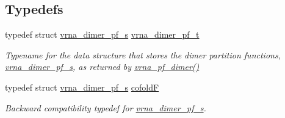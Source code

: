 \subsection*{Typedefs}
\begin{DoxyCompactItemize}
\item 
typedef struct \mbox{\hyperlink{group__pf__cofold_structvrna__dimer__pf__s}{vrna\+\_\+dimer\+\_\+pf\+\_\+s}} \mbox{\hyperlink{group__pf__cofold_ga444df1587c9a2ca15b8eb25188f629c3}{vrna\+\_\+dimer\+\_\+pf\+\_\+t}}
\begin{DoxyCompactList}\small\item\em Typename for the data structure that stores the dimer partition functions, \mbox{\hyperlink{group__pf__cofold_structvrna__dimer__pf__s}{vrna\+\_\+dimer\+\_\+pf\+\_\+s}}, as returned by \mbox{\hyperlink{group__pf__cofold_ga4e5c7d06c302a7c59fc0d64dc142ca63}{vrna\+\_\+pf\+\_\+dimer()}} \end{DoxyCompactList}\item 
typedef struct \mbox{\hyperlink{group__pf__cofold_structvrna__dimer__pf__s}{vrna\+\_\+dimer\+\_\+pf\+\_\+s}} \mbox{\hyperlink{group__pf__cofold_ga5445d8d96a40e9e79b1fa5a7f1a6b7ea}{cofoldF}}
\begin{DoxyCompactList}\small\item\em Backward compatibility typedef for \mbox{\hyperlink{group__pf__cofold_structvrna__dimer__pf__s}{vrna\+\_\+dimer\+\_\+pf\+\_\+s}}. \end{DoxyCompactList}\end{DoxyCompactItemize}
